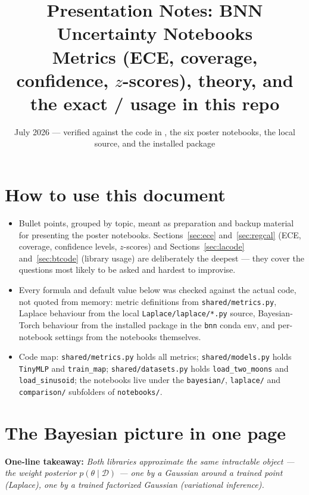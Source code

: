 \documentclass[10pt,a4paper]{article}
\title{\vspace{-1.2cm}Presentation Notes: BNN Uncertainty Notebooks\\
\large Metrics (ECE, coverage, confidence, $z$-scores), theory, and the exact
\code{laplace-torch} / \code{bayesian-torch} usage in this repo}
\author{}
\date{July 2026 --- verified against the code in \code{shared/metrics.py}, the six poster
notebooks, the local \code{Laplace/} source, and the installed \code{bayesian\_torch} package}
\newcommand{\code}[1]{\texttt{#1}}
\newcommand{\takeaway}[1]{\textbf{One-line takeaway:} \emph{#1}}
\begin{document}
\maketitle
\vspace{-1.4cm}

\section*{How to use this document}
\begin{itemize}
\item Bullet points, grouped by topic, meant as preparation and backup material for presenting the
  poster notebooks. Sections~\ref{sec:ece} and~\ref{sec:regcal} (ECE, coverage, confidence levels,
  $z$-scores) and Sections~\ref{sec:lacode} and~\ref{sec:btcode} (library usage) are deliberately
  the deepest --- they cover the questions most likely to be asked and hardest to improvise.
\item Every formula and default value below was checked against the actual code, not quoted from
  memory: metric definitions from \code{shared/metrics.py}, Laplace behaviour from the local
  \code{Laplace/laplace/*.py} source, Bayesian-Torch behaviour from the installed package in the
  \code{bnn} conda env, and per-notebook settings from the notebooks themselves.
\item Code map: \code{shared/metrics.py} holds all metrics; \code{shared/models.py} holds
  \code{TinyMLP} and \code{train\_map}; \code{shared/datasets.py} holds \code{load\_two\_moons}
  and \code{load\_sinusoid}; the notebooks live under the \code{bayesian/}, \code{laplace/} and
  \code{comparison/} subfolders of \code{notebooks/}.
\end{itemize}

\tableofcontents

\section{The Bayesian picture in one page}\label{sec:bayes}
\takeaway{Both libraries approximate the same intractable object --- the weight posterior
$p(\theta\mid\mathcal{D})$ --- one by a Gaussian around a trained point (Laplace), one by a trained
factorized Gaussian (variational inference).}
\end{document}
